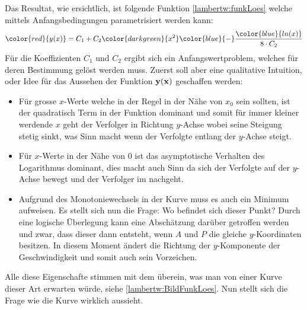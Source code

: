 Das Resultat, wie ersichtlich, ist folgende Funktion \eqref{lambertw:funkLoes} welche mittels Anfangsbedingungen parametrisiert werden kann: 
\begin{equation}
	{\color{red}{y(x)}}
	=
	C_1 + C_2 {\color{darkgreen}{x^2}} {\color{blue}{-}} \frac{\color{blue}{ln(x)}}{8 \cdot C_2}
	\label{lambertw:funkLoes}
\end{equation}
Für die Koeffizienten \(C_1\) und \(C_2\) ergibt sich ein Anfangswertproblem, welches für deren Bestimmung gelöst werden muss. Zuerst soll aber eine qualitative Intuition, oder Idee für das Aussehen der Funktion \(\bf{y(x)}\) geschaffen werden:
\begin{itemize}
	\item
	Für grosse \(x\)-Werte welche in der Regel in der Nähe von \(x_0\) sein sollten, ist der quadratisch Term in der Funktion dominant und somit für immer kleiner werdende \(x\) geht der Verfolger in Richtung \(y\)-Achse wobei seine Steigung stetig sinkt, was Sinn macht wenn der Verfolgte entlang der \(y\)-Achse steigt.
	\item
	Für \(x\)-Werte in der Nähe von \(0\) ist das asymptotische Verhalten des Logarithmus dominant, dies macht auch Sinn da sich der Verfolgte auf der \(y\)-Achse bewegt und der Verfolger im nachgeht.
	\item
	Aufgrund des Monotoniewechsels in der Kurve muss es auch ein Minimum aufweisen. Es stellt sich nun die Frage: Wo befindet sich dieser Punkt? Durch eine logische Überlegung kann eine Abschätzung darüber getroffen werden und zwar, dass dieser dann entsteht, wenn \(A\) und \(P\) die gleiche \(y\)-Koordinaten besitzen. In diesem Moment ändert die Richtung der \(y\)-Komponente der Geschwindigkeit und somit auch sein Vorzeichen.
\end{itemize}
Alle diese Eigenschafte stimmen mit dem überein, was man von einer Kurve dieser Art erwarten würde, siehe \ref{lambertw:BildFunkLoes}. Nun stellt sich die Frage wie die Kurve wirklich aussieht.

